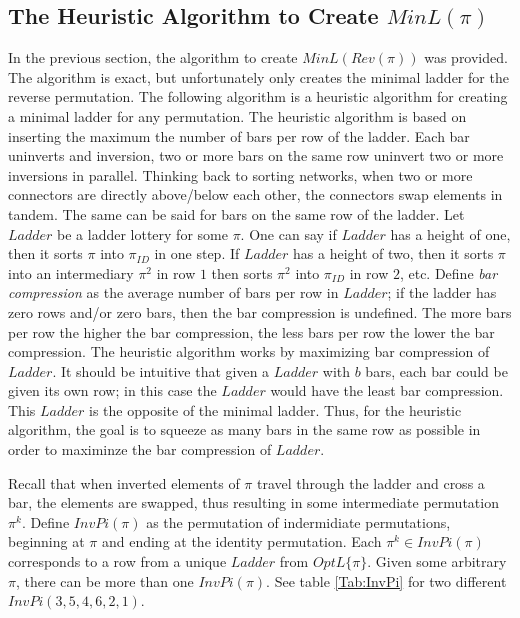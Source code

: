 \subsection{The Heuristic Algorithm to Create $MinL(\pi)$}

In the previous section, the algorithm to create $MinL(Rev(\pi))$ was provided. The algorithm 
is exact, but unfortunately only creates the minimal ladder for the reverse permutation. The following algorithm 
is a heuristic algorithm for creating a minimal ladder for any permutation. The heuristic algorithm 
is based on inserting the maximum the number of bars per row of the ladder. Each bar uninverts and inversion, 
two or more bars on the same row uninvert two or more inversions in parallel. Thinking back to sorting networks, 
when two or more connectors are directly above/below each other, the connectors swap elements in tandem. The same 
can be said for bars on the same row of the ladder. Let $Ladder$ be a ladder lottery for some $\pi$. 
One can say if $Ladder$ has a height of 
one, then it sorts $\pi$ into $\pi_{ID}$ in one step. If $Ladder$ has a height of two, then it sorts $\pi$ into an intermediary $\pi^{2}$
in row $1$ then sorts $\pi^{2}$ into $\pi_{ID}$ in row $2$, etc.
Define \emph{bar compression} as the average number of bars per row in $Ladder$; if the ladder has zero rows and/or zero bars, then the 
bar compression is undefined. The more bars per row the higher the bar compression, the less bars per row the lower the bar compression. The heuristic algorithm 
works by maximizing bar compression of $Ladder$. It should be intuitive that given a $Ladder$ with $b$ bars, 
each bar could be given its own row; in this case the $Ladder$ would have the least bar compression. This $Ladder$ 
is the opposite of the minimal ladder. Thus, for the heuristic algorithm, the goal is to squeeze as many bars in the same row as possible in 
order to maximinze the bar compression of $Ladder$.\par 
Recall that when inverted elements of $\pi$ travel through the ladder and cross a bar, the elements are swapped, thus resulting in 
some intermediate permutation $\pi^{k}$. Define $InvPi(\pi)$ as the permutation of indermidiate permutations, beginning at $\pi$ and 
ending at the identity permutation. Each $\pi^{k} \in InvPi(\pi)$ corresponds to a row from a unique $Ladder$ from $OptL\{\pi\}$. 
Given some arbitrary $\pi$, there can be more than one $InvPi(\pi)$. See table \ref{Tab:InvPi} 
for two different $InvPi(3,5,4,6,2,1)$.

